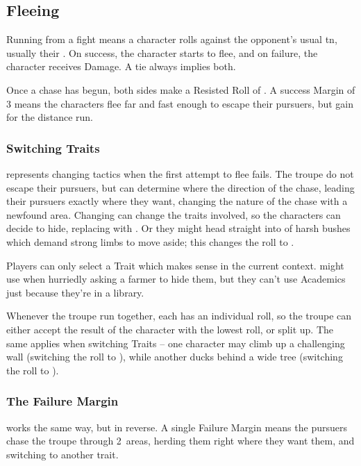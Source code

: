 \begin{multicols}{2}

\subsection{Fleeing}

Running from a fight means a character rolls  against the opponent's usual \gls{tn}, usually their .
On success, the character starts to flee, and on failure, the character receives Damage.
A tie always implies both.

Once a chase has begun, both sides make a Resisted Roll of .
A success Margin of 3 means the characters flee far and fast enough to escape their pursuers, but gain  for the distance run.

\subsubsection{Switching Traits}
represents changing tactics when the first attempt to flee fails.
The troupe do not escape their pursuers, but can determine where the direction of the chase, leading their pursuers exactly where they want, changing the nature of the chase with a newfound \gls{area}.
Changing  can change the \glspl{trait} involved, so the characters can decide to hide, replacing  with .
Or they might head straight into  of harsh bushes which demand strong limbs to move aside; this changes the roll to .

Players can only select a Trait which makes sense in the current context.
 might use  when hurriedly asking a farmer to hide them, but they can't use Academics just because they're in a library.

Whenever the troupe run together, each has an individual roll, so the troupe can either accept the result of the character with the lowest roll, or split up.
The same applies when switching Traits -- one character may climb up a challenging wall (switching the roll to ), while another ducks behind a wide tree (switching the roll to ).

\subsubsection{The Failure Margin}
works the same way, but in reverse.
A single Failure Margin means the pursuers chase the troupe through 2~\glspl{area}, herding them right where they want them, and switching to another \gls{trait}.


\end{multicols}
